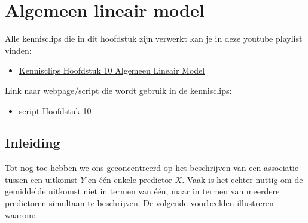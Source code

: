 \documentclass[
  12pt,dutch,coursenotes]{book}
\providecommand{\tightlist}{%
  \setlength{\itemsep}{0pt}\setlength{\parskip}{0pt}}
\begin{document}
\hypertarget{chap-glm}{%
\chapter{Algemeen lineair model}\label{chap-glm}}

Alle kennisclips die in dit hoofdstuk zijn verwerkt kan je in deze youtube playlist vinden:

\begin{itemize}
\tightlist
\item
  \href{https://www.youtube.com/playlist?list=PLZH1hP8_LbJLuEaRpvAkW7oQLCCjHqUS4}{Kennisclips Hoofdstuk 10 Algemeen Lineair Model}
\end{itemize}

Link naar webpage/script die wordt gebruik in de kennisclips:

\begin{itemize}
\tightlist
\item
  \href{https://statomics.github.io/sbc21/rmd/10-MultipleRegression.html}{script Hoofdstuk 10}
\end{itemize}

\hypertarget{inleiding-9}{%
\section{Inleiding}\label{inleiding-9}}

Tot nog toe hebben we ons geconcentreerd op het beschrijven van een
associatie tussen een uitkomst \(Y\) en één enkele predictor \(X\).
Vaak is het echter nuttig om de gemiddelde uitkomst niet in termen van
één, maar in termen van meerdere predictoren simultaan te beschrijven.
De volgende voorbeelden illustreren waarom:
\end{document}

